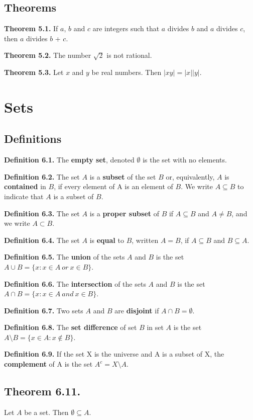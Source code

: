 \documentclass{article}
\begin{document}
\subsection{Theorems}
\textbf{Theorem 5.1.} If $a$, $b$ and $c$ are integers such that $a$ divides $b$ and $a$ divides $c$, then $a$ divides $b$ + $c$.

\textbf{Theorem 5.2.} The number $\sqrt{2}$ is not rational.

\textbf{Theorem 5.3.} Let $x$ and $y$ be real numbers. Then $|xy| = |x||y|$.


\section{Sets}
\subsection{Definitions}
\textbf{Definition 6.1.} The \textbf{empty set}, denoted $\emptyset$ is the set with no elements.

\textbf{Definition 6.2.} The set $A$ is a \textbf{subset} of the set $B$ or, equivalently, $A$ is \textbf{contained} in $B$, if every element of A is an element of $B$. We write $A \subseteq B$ to indicate that $A$ is a subset of $B$. 

\textbf{Definition 6.3.} The set $A$ is a \textbf{proper subset} of $B$ if $A \subseteq B$ and $A \neq B$, and we write $A \subset B$.

\textbf{Definition 6.4.} The set $A$ is \textbf{equal} to $B$, written $A = B$, if $A \subseteq B$ and $B \subseteq A$.

\textbf{Definition 6.5.} The \textbf{union} of the sets $A$ and $B$ is the set 
	$A \cup B = \{x : x \in A\ or\ x \in B \}$.
	
\textbf{Definition 6.6.} The \textbf{intersection} of the sets $A$ and $B$ is the set 
	$A \cap B = \{x : x \in A\ and\ x \in B \}$.
	
\textbf{Definition 6.7.} Two sets $A$ and $B$ are \textbf{disjoint} if $A \cap B = \emptyset$.

\textbf{Definition 6.8.} The \textbf{set difference} of set $B$ in set $A$ is the set 
	$A \setminus B = \{x \in A : x \notin B \}$.
	
\textbf{Definition 6.9.} If the set X is the universe and A is a subset of X, the  \textbf{complement} of A is the set $A^c = X \setminus A$.

\subsection{Theorem 6.11.} Let $A$ be a set. Then $\emptyset \subseteq A$. 
\end{document}
